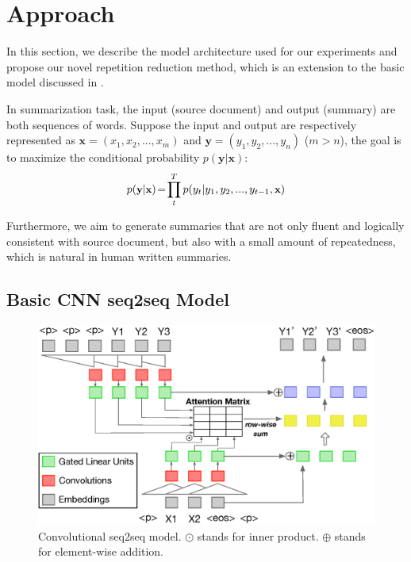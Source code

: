 \section{Approach}
\label{sec:approach}

In this section, we describe the model architecture used for our experiments
and propose our novel repetition reduction method, which is an extension to the basic model discussed in .

In summarization task, the input (source document) and
output (summary) are both sequences of words.
Suppose the input and output are respectively represented as
$\textbf{x} = (x_{1},x_{2},...,x_{m})$ and 
$\textbf{y} = (y_{1}, y_{2},..., y_{n})$ ($m>n$),
the goal is to maximize the conditional probability
$p(\textbf{y}|\textbf{x})$:
\begin{equation}
\small
p(\textbf{y} | \textbf{x}) \!=\! {\prod^T_{t} {p(y_{t} | y_{1}, y_{2},..., y_{t-1}, \textbf{x}})}
\end{equation}

Furthermore, we aim to generate summaries that are not only fluent 
and logically consistent with source document, but also with 
a small amount of repeatedness, which is natural in human written summaries.  

\subsection{Basic CNN seq2seq Model}
\label{sec:basic}

\begin{figure}[th]
    \centering
    \includegraphics[width=0.9\linewidth]{cnn}
    \caption{Convolutional seq2seq model. $\odot$ stands for inner product. $\oplus$ stands for element-wise addition.}
    \label{fig:basicModel}
\end{figure}

